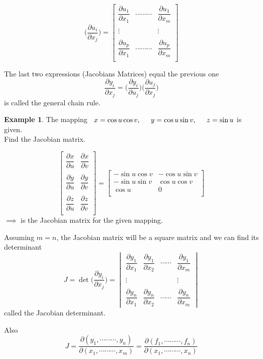 \documentclass[11pt,a4paper]{article}
\theoremstyle{definition}
\newtheorem{exa}[thm]{Example}
\begin{document}
$$\Bigg(\frac{\partial u_i}{\partial x_j}\Bigg) =
\begin{bmatrix}
\dfrac{\partial u_1}{\partial x_1} & \cdots\cdots\cdots & \dfrac{\partial u_1}{\partial x_m}\\\\
\vdots &&\vdots\\\\
\dfrac{\partial u_p}{\partial x_1} & \cdots\cdots\cdots & \dfrac{\partial u_p}{\partial x_m}\\
\end{bmatrix}
$$

The last two expressions (Jacobians Matrices) equal the previous one
$$\frac{\partial y_i}{\partial x_j}= \Bigg(\frac{\partial y_i}{\partial u_j}\Bigg)\Bigg(\frac{\partial u_j}{\partial x_j}\Bigg)$$
is called the general chain rule.


\begin{exa}


The mapping $\hspace{0.2cm} x = \cos u \cos v,\hspace{0.5cm} y = \cos u \sin v,\hspace{0.5cm} z = \sin u$ is given.\\ Find the Jacobian matrix.

$$
\begin{bmatrix}
\dfrac{\partial x}{\partial u} & \dfrac{\partial x}{\partial v}\\\\
\dfrac{\partial y}{\partial u} & \dfrac{\partial y}{\partial v}\\\\
\dfrac{\partial z}{\partial u} & \dfrac{\partial z}{\partial v}\\
\end{bmatrix} =
\begin{bmatrix}
-\sin u \cos v & - \cos u\sin v\\
-\sin u \sin v & \cos u \cos v\\
\cos u         & 0\\
\end{bmatrix}
$$
$\implies$ is the Jacobian matrix for the given mapping.


Assuming $m=n$, the Jacobian matrix will be a square matrix and we can find its determinant
$$ J = \det \Bigg(\frac{\partial y_i}{\partial x_j}\Bigg)=
\begin{vmatrix}
\dfrac{\partial y_1}{\partial x_1} & \dfrac{\partial y_1}{\partial x_2} & \cdots\cdots & \dfrac{\partial y_1}{\partial x_m}\\\\
\vdots & && \vdots\\\\
\dfrac{\partial y_n}{\partial x_1} & \dfrac{\partial y_n}{\partial x_2} & \cdots\cdots & \dfrac{\partial y_n}{\partial x_m}
\end{vmatrix}
$$
called the Jacobian determinant.


Also
$$J = \frac{\partial(y_1,\cdots\cdots\cdots,y_n)}{\partial (x_1,\cdots\cdots\cdots,x_m)} = \frac{\partial (f_1,\cdots\cdots\cdots,f_n)}{\partial (x_1,\cdots\cdots\cdots,x_n)}$$
\end{exa}
\end{document}
